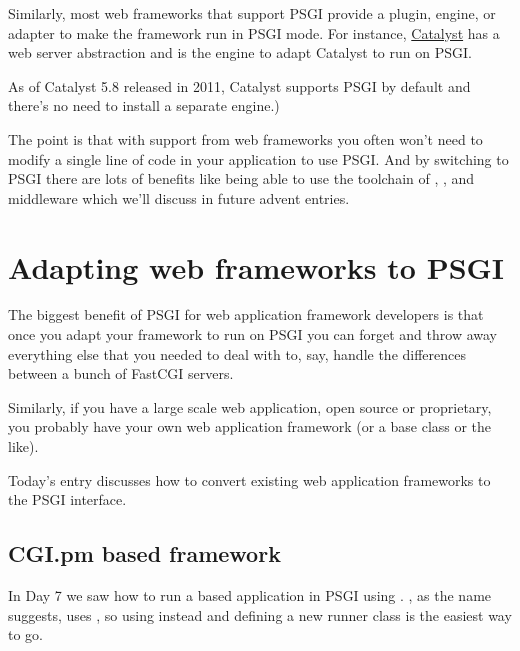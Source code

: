 Similarly, most web frameworks that support PSGI provide a plugin,
engine, or adapter to make the framework run in PSGI mode. For instance,
\href{http://www.catalystframework.org/}{Catalyst} has a
 web server abstraction and
\href{http://search.cpan.org/perldoc?Catalyst::Engine::PSGI}{}
is the engine to adapt Catalyst to run on PSGI. 

\begin{note}
  As of Catalyst 5.8 released in 2011, Catalyst supports PSGI by default and
  there's no need to install a separate engine.)
\end{note}

The point is that with support from web frameworks you often won't need
to modify a single line of code in your application to use PSGI. And by
switching to PSGI there are lots of benefits like being able to use the
toolchain of , , and middleware which we'll discuss in
future advent entries.

\chapter{Adapting web frameworks to
PSGI}\label{day-8-adapting-web-frameworks-to-psgi}

The biggest benefit of PSGI for web application framework developers is
that once you adapt your framework to run on PSGI you can forget and
throw away everything else that you needed to deal with to, say, handle
the differences between a bunch of FastCGI servers.

Similarly, if you have a large scale web application, open source or
proprietary, you probably have your own web application framework (or a
base class or the like).

Today's entry discusses how to convert existing web application
frameworks to the PSGI interface.

\section{CGI.pm based framework}\label{cgi.pm-based-framework}

In Day 7 we saw how to run a  based application in PSGI
using . , as the name suggests,
uses , so using  instead and defining a new runner class
is the easiest way to go.

